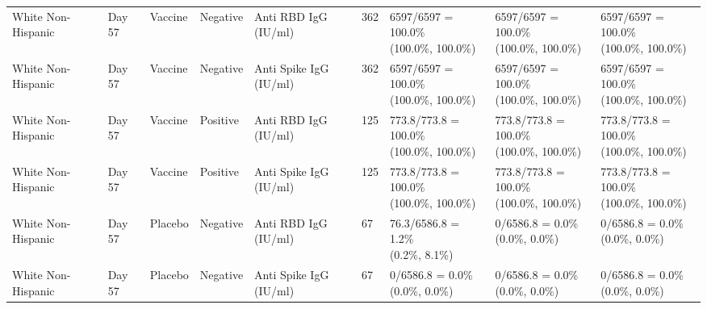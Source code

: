\documentclass[]{book}
\theoremstyle{definition}
\theoremstyle{definition}
\theoremstyle{definition}
\newcommand{\1}{\mathbbm{1}}
\begin{document}
\begin{landscape}
\begin{ThreePartTable}
\begin{longtable}[t]{>{\raggedright\arraybackslash}p{2.7cm}llllllll}
\hspace{1em}White Non-Hispanic & Day 57 & Vaccine & Negative & Anti RBD IgG (IU/ml) & 362 & \makecell[l]{6597/6597 = 100.0\%\\(100.0\%, 100.0\%)} & \makecell[l]{6597/6597 = 100.0\%\\(100.0\%, 100.0\%)} & \makecell[l]{6597/6597 = 100.0\%\\(100.0\%, 100.0\%)}\\
\hspace{1em}White Non-Hispanic & Day 57 & Vaccine & Negative & Anti Spike IgG (IU/ml) & 362 & \makecell[l]{6597/6597 = 100.0\%\\(100.0\%, 100.0\%)} & \makecell[l]{6597/6597 = 100.0\%\\(100.0\%, 100.0\%)} & \makecell[l]{6597/6597 = 100.0\%\\(100.0\%, 100.0\%)}\\
\hspace{1em}White Non-Hispanic & Day 57 & Vaccine & Positive & Anti RBD IgG (IU/ml) & 125 & \makecell[l]{773.8/773.8 = 100.0\%\\(100.0\%, 100.0\%)} & \makecell[l]{773.8/773.8 = 100.0\%\\(100.0\%, 100.0\%)} & \makecell[l]{773.8/773.8 = 100.0\%\\(100.0\%, 100.0\%)}\\
\hspace{1em}White Non-Hispanic & Day 57 & Vaccine & Positive & Anti Spike IgG (IU/ml) & 125 & \makecell[l]{773.8/773.8 = 100.0\%\\(100.0\%, 100.0\%)} & \makecell[l]{773.8/773.8 = 100.0\%\\(100.0\%, 100.0\%)} & \makecell[l]{773.8/773.8 = 100.0\%\\(100.0\%, 100.0\%)}\\
\hspace{1em}White Non-Hispanic & Day 57 & Placebo & Negative & Anti RBD IgG (IU/ml) & 67 & \makecell[l]{76.3/6586.8 = 1.2\%\\(0.2\%, 8.1\%)} & \makecell[l]{0/6586.8 = 0.0\%\\(0.0\%, 0.0\%)} & \makecell[l]{0/6586.8 = 0.0\%\\(0.0\%, 0.0\%)}\\
\hspace{1em}White Non-Hispanic & Day 57 & Placebo & Negative & Anti Spike IgG (IU/ml) & 67 & \makecell[l]{0/6586.8 = 0.0\%\\(0.0\%, 0.0\%)} & \makecell[l]{0/6586.8 = 0.0\%\\(0.0\%, 0.0\%)} & \makecell[l]{0/6586.8 = 0.0\%\\(0.0\%, 0.0\%)}\\

\end{longtable}
\end{ThreePartTable}
\end{landscape}
\end{document}
